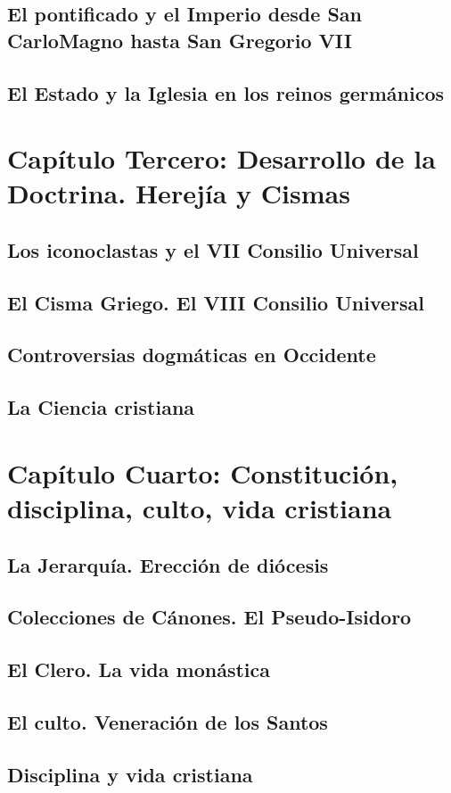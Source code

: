 \raggedbottom{} \documentclass[12pt, a4paper, openany]{book} %
\begin{document}
\section{El pontificado y el Imperio desde San CarloMagno hasta San Gregorio VII}
\section{El Estado y la Iglesia en los reinos germánicos}
\chapter{Capítulo Tercero: Desarrollo de la Doctrina. Herejía y Cismas}
\section{Los iconoclastas y el VII Consilio Universal}
\section{El Cisma Griego. El VIII Consilio Universal}
\section{Controversias dogmáticas en Occidente}
\section{La Ciencia cristiana}
\chapter{Capítulo Cuarto: Constitución, disciplina, culto, vida cristiana}
\section{La Jerarquía. Erección de diócesis}
\section{Colecciones de Cánones. El Pseudo-Isidoro}
\section{El Clero. La vida monástica}
\section{El culto. Veneración de los Santos}
\section{Disciplina y vida cristiana}
\end{document}
